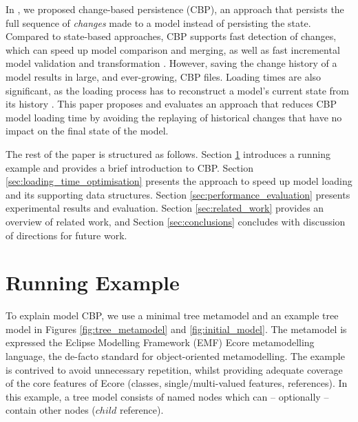 \documentclass{llncs}
\begin{document}
    In \cite{yohannis2017turning}, we proposed change-based persistence (CBP), an approach that persists the full sequence of \emph{changes} made to a model instead of persisting the state. Compared to state-based approaches, CBP supports fast detection of changes, which can speed up model comparison and merging, as well as fast incremental model validation and transformation \cite{rath2012derived,ogunyomi2015property}. However, saving the change history of a model results in large, and ever-growing, CBP files.  Loading times are also significant, as the loading process has to reconstruct a model's current state from its history \cite{yohannis2017turning}.   This paper proposes and evaluates an approach that reduces CBP model loading time by avoiding the replaying of historical changes that have no impact on the final state of the model.
    
    The rest of the paper is structured as follows. Section \ref{sec:case_study} introduces a running example and provides a brief introduction to CBP.
    Section \ref{sec:loading_time_optimisation} presents the approach to speed up model loading and its supporting data structures. Section \ref{sec:performance_evaluation} presents experimental results and evaluation. Section \ref{sec:related_work} provides an overview of related work, and Section \ref{sec:conclusions} concludes with discussion of directions for future work.
    
    \vspace{-15pt}
    \section{Running Example}
    \label{sec:case_study}
    \vspace{-10pt}
    To explain model CBP, we use a minimal tree metamodel and an example tree model in Figures \ref{fig:tree_metamodel} and \ref{fig:initial_model}.
    The metamodel is expressed the Eclipse Modelling Framework (EMF) Ecore metamodelling language, the de-facto standard for object-oriented metamodelling.  The example is contrived to avoid unnecessary repetition, whilst providing adequate coverage of the core features of Ecore (classes, single/multi-valued features, references).
    In this example, a tree model consists of named nodes which can -- optionally -- contain other nodes ($child$ reference).
    
\end{document}
